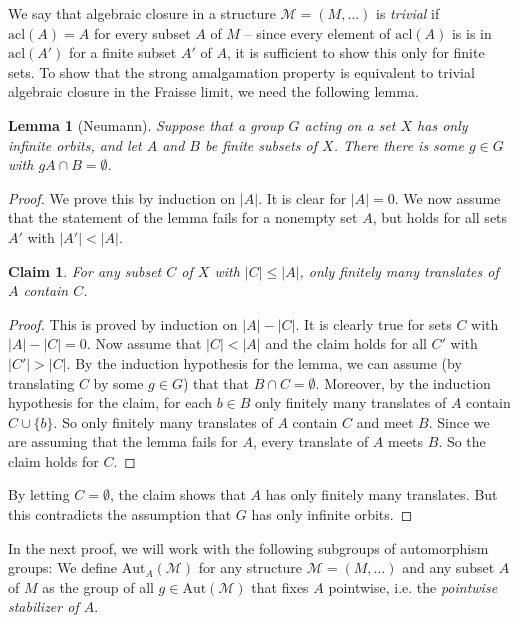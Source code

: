 \documentclass[10pt]{amsart}
\newcommand{\MM}{\mathcal{M}}
\newcommand{\acl}{\mathrm{acl}}
\newcommand{\Aut}{\mathrm{Aut}}
\newtheorem{lemma}[theorem]{Lemma}
\newtheorem{claim}[theorem]{Claim}
\theoremstyle{definition}
\theoremstyle{remark}
\begin{document}
We say that algebraic closure in a structure $\MM=(M,\dots)$ is \emph{trivial} if $\acl(A)=A$ for every subset $A$ of $M$ -- since every element of $\acl(A)$ is is in $\acl(A')$ for a finite subset $A'$ of $A$, it is sufficient to show this only for finite sets. To show that the strong amalgamation property is equivalent to trivial algebraic closure in the Fraisse limit, we need the following lemma. 

\begin{lemma} [Neumann] \label{Neumann's lemma} 
Suppose that a group $G$ acting on a set $X$ has only infinite orbits, and let $A$ and $B$ be finite subsets of $X$. There there is some $g\in G$ with $g A \cap B=\emptyset$. 
\end{lemma} 
\begin{proof} 
We prove this by induction on $|A|$. It is clear for $|A|=0$. We now assume that the statement of the lemma fails for a nonempty set $A$, but holds for all sets $A'$ with $|A'|<|A|$. 

\begin{claim} 
For any subset $C$ of $X$ with $|C|\leq |A|$, only finitely many translates of $A$ contain $C$. 
\end{claim} 
\begin{proof} 
This is proved by induction on $|A|-|C|$. It is clearly true for sets $C$ with $|A|-|C|=0$. Now assume that $|C|<|A|$ and the claim holds for all $C'$ with $|C'|>|C|$. By the induction hypothesis for the lemma, we can assume (by translating $C$ by some $g\in G$) that that $B\cap C=\emptyset$. Moreover, by the induction hypothesis for the claim, for each $b\in B$ only finitely many translates of $A$ contain $C\cup\{b\}$. So only finitely many translates of $A$ contain $C$ and meet $B$. Since we are assuming that the lemma fails for $A$, every translate of $A$ meets $B$. So the claim holds for $C$. 
\end{proof} 
By letting $C=\emptyset$, the claim shows that $A$ has only finitely many translates. But this contradicts the assumption that $G$ has only infinite orbits. 
\end{proof} 

In the next proof, we will work with the following subgroups of automorphism groups: We define $\Aut_A(\MM)$ for any structure $\MM=(M,\dots)$ and any subset $A$ of $M$ as the group of all $g\in \Aut(\MM)$ that fixes $A$ pointwise, i.e. the \emph{pointwise stabilizer of $A$}. 
\end{document}
